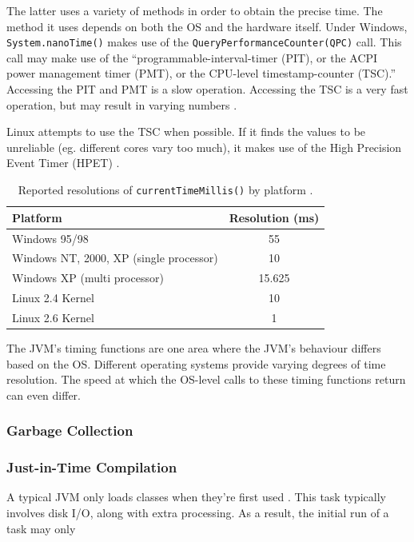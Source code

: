\documentclass[12pt,letterpaper,oneside]{report}
\theoremstyle{definition}
\begin{document}
					The latter uses a variety of methods in order to obtain the precise time.  The method it uses depends on both the OS and the hardware itself.  Under Windows, \texttt{System.nanoTime()} makes use of the \texttt{QueryPerformanceCounter(QPC)} call.  This call may make use of the ``programmable-interval-timer (PIT), or the ACPI power management timer (PMT), or the CPU-level timestamp-counter (TSC).'' \cite{hotspot-timer-06}  Accessing the PIT and PMT is a slow operation.  Accessing the TSC is a very fast operation, but may result in varying numbers \cite{linux-tsc-06}.
					
					Linux attempts to use the TSC when possible.  If it finds the values to be unreliable (eg. different cores vary too much), it makes use of the High Precision Event Timer (HPET) \cite{linux-tsc-06}.
					
					\begin{table}[!ht]
						\centering
						\begin{tabular}{lc}
							\toprule
							Platform & Resolution (ms) \\
							\midrule
							Windows 95/98 & 55 \\
							Windows NT, 2000, XP (single processor) & 10 \\
							Windows XP (multi processor) & 15.625 \\
							Linux 2.4 Kernel & 10 \\
							Linux 2.6 Kernel & 1 \\
							\bottomrule
						\end{tabular}
						\caption{Reported resolutions of \texttt{currentTimeMillis()} by platform \cite{rob-java-bench-08}.}
					\end{table}
					
					The JVM's timing functions are one area where the JVM's behaviour differs based on the OS.  Different operating systems provide varying degrees of time resolution.  The speed at which the OS-level calls to these timing functions return can even differ.
				
				\subsubsection{Garbage Collection}
			
				\subsubsection{Just-in-Time Compilation}
					A typical JVM only loads classes when they're first used \cite{rob-java-bench-08}.  This task typically involves disk I/O, along with extra processing.  As a result, the initial run of a task may only 
				
\end{document}
